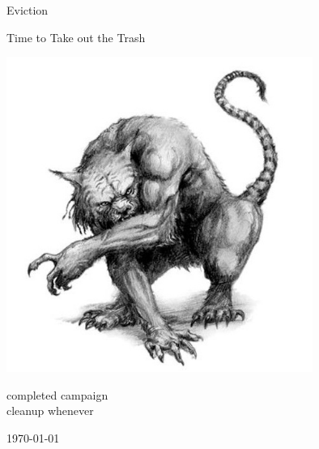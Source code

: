 



\usepackage{svg}











\thispagestyle{empty}

\null          %
\vspace{1cm}   %

\begin{center}

\huge
Eviction

\vspace{0.3\baselineskip}

\large
Time to Take out the Trash

\vspace{2cm}

\includegraphics[width=100mm]{./fig/trollcat.jpg}

\vspace{2 cm}


\normalsize
completed campaign    \\
cleanup whenever

\vfill

\today

\end{center}






